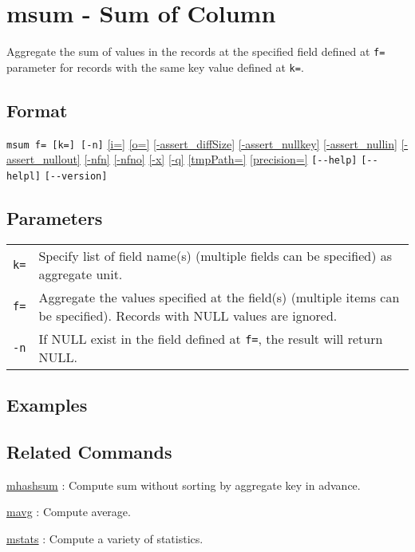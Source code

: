 
%

\section{msum - Sum of Column\label{sect:msum}}

Aggregate the sum of values in the records at the specified field defined at \verb|f=| parameter for records with the same key value defined at \verb|k=|. \\

\subsection*{Format}
\verb|msum f= [k=] [-n]| 
\hyperref[sect:option_i]{[i=]}
\hyperref[sect:option_o]{[o=]}
\hyperref[sect:option_assert_diffSize]{[-assert\_diffSize]}
\hyperref[sect:option_assert_nullkey]{[-assert\_nullkey]}
\hyperref[sect:option_assert_nullin]{[-assert\_nullin]}
\hyperref[sect:option_assert_nullout]{[-assert\_nullout]}
\hyperref[sect:option_nfn]{[-nfn]} 
\hyperref[sect:option_nfno]{[-nfno]}  
\hyperref[sect:option_x]{[-x]}
\hyperref[sect:option_q]{[-q]}
\hyperref[sect:option_tmpPath]{[tmpPath=]} 
\hyperref[sect:option_precision]{[precision=]}
\verb|[--help]|
\verb|[--helpl]|
\verb|[--version]|\\

\subsection*{Parameters}
\begin{table}[htbp]
{\small
\begin{tabular}{ll}
\verb|k=|    & Specify list of field name(s) (multiple fields can be specified) as aggregate unit. \\

\verb|f=|    & Aggregate the values specified at the field(s) (multiple items can be specified). Records with NULL values are ignored. \\
\verb|-n|    & If NULL exist in the field defined at \verb|f=|, the result will return NULL. \\
\end{tabular} 
}
\end{table} 

\subsection*{Examples}

\subsection*{Related Commands}
\hyperref[sect:mhashsum]{mhashsum} : Compute sum without sorting by aggregate key in advance. 

\hyperref[sect:mavg]{mavg} : Compute average. 

\hyperref[sect:mstats]{mstats} : Compute a variety of statistics.

%
